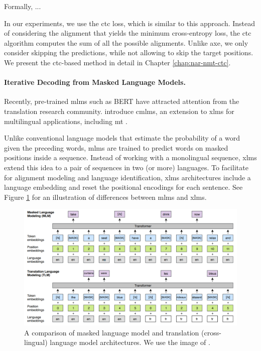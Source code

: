 
Formally, ... 

In our experiments, we use the \ac{ctc} loss, which is similar to this
approach. Instead of considering the alignment that yields the minimum
cross-entropy loss, the \ac{ctc} algorithm computes the sum of all the possible
alignments. Unlike \ac{axe}, we only consider skipping the predictions, while
not allowing to skip the target positions. We present the \ac{ctc}-based method
in detail in Chapter \ref{chap:nar-nmt-ctc}.

\paragraph{Iterative Decoding from Masked Language Models.} Recently,
pre-trained \acp{mlm} such as BERT \citep{devlin-etal-2019-bert} have attracted
attention from the translation research
community. \citet{ghazvininejad-etal-2019-mask} introduce \acp{cmlm}, an
extension to \acp{xlm} for multilingual applications, including \ac{mt}
\citep{conneau-lample-2019-cross}.

Unlike conventional language models that estimate the probability of a word
given the preceding words, \acp{mlm} are trained to predict words on masked
positions inside a sequence. Instead of working with a monolingual sequence,
\acp{xlm} extend this idea to a pair of sequences in two (or more) languages.
To facilitate for alignment modeling and language identification, \acp{xlm}
architectures include a language embedding and reset the positional encodings
for each sentence. See Figure \ref{fig:mlm-xlm-example} for an illustration of
differences between \acp{mlm} and \acp{xlm}.

\begin{figure}
  \centering

  \includegraphics[width=.95\textwidth]{img/mlm-xlm.png}

  \caption{A comparison of masked language model and translation
    (cross-lingual) language model architectures. We use the image of
    \citet{conneau-lample-2019-cross}.}%
  \label{fig:mlm-xlm-example}
\end{figure}





